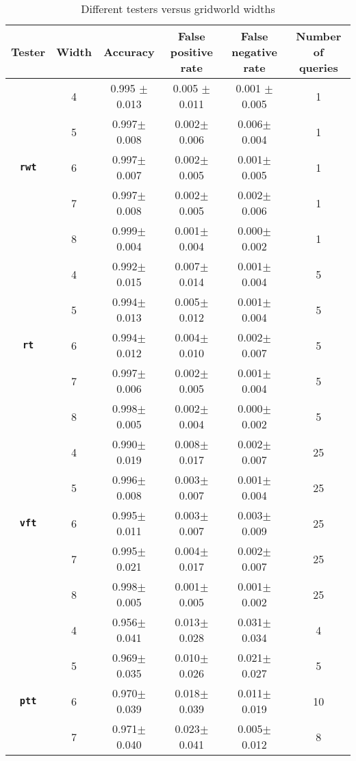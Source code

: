 \begin{table}[h]
  \caption{Different testers versus gridworld widths}
  \label{tab:diff_gwWidth}
  \centering
  \begin{tabular}{cccccc}
    \toprule
    \textbf{Tester}     & \textbf{Width}     & \textbf{Accuracy} & \textbf{False positive rate} & \textbf{False negative rate} & \textbf{Number of queries} \\
    \midrule
      & 4 & 0.995 $\pm$ 0.013 & 0.005	$\pm$ 0.011 & 0.001 $\pm$ 0.005	& 1  \\
     & 5 & 0.997$\pm$	0.008&	0.002$\pm$	0.006&	0.006$\pm$	0.004&	1\\
     \textbf{\texttt{rwt}} & 6 & 0.997$\pm$	0.007&	0.002$\pm$	0.005&	0.001$\pm$	0.005&	1\\
     & 7 & 0.997$\pm$	0.008&	0.002$\pm$	0.005&	0.002$\pm$	0.006&	1\\
     & 8 & 0.999$\pm$	0.004&	0.001$\pm$	0.004&	0.000$\pm$	0.002&	1\\
     \midrule
      & 4 & 0.992$\pm$	0.015&	0.007$\pm$	0.014&	0.001$\pm$	0.004&	5\\
     & 5 & 0.994$\pm$	0.013&	0.005$\pm$	0.012&	0.001$\pm$	0.004&	5\\
     \textbf{\texttt{rt}}& 6 & 0.994$\pm$	0.012&	0.004$\pm$	0.010&	0.002$\pm$	0.007&	5\\
     & 7 & 0.997$\pm$	0.006&	0.002$\pm$	0.005&	0.001$\pm$	0.004&	5\\
     & 8 & 0.998$\pm$	0.005&	0.002$\pm$	0.004&	0.000$\pm$	0.002&	5\\ 
     \midrule
      & 4 & 0.990$\pm$	0.019&	0.008$\pm$	0.017&	0.002$\pm$	0.007&	25\\
     & 5 & 0.996$\pm$	0.008&	0.003$\pm$	0.007&	0.001$\pm$	0.004&	25\\
     \textbf{\texttt{vft}}& 6 & 0.995$\pm$	0.011&	0.003$\pm$	0.007&	0.003$\pm$	0.009&	25\\
     & 7 & 0.995$\pm$	0.021&	0.004$\pm$	0.017&	0.002$\pm$	0.007&	25\\
     & 8 & 0.998$\pm$	0.005&	0.001$\pm$	0.005&	0.001$\pm$	0.002&	25\\
     \midrule
      & 4 & 0.956$\pm$	0.041&	0.013$\pm$	0.028&	0.031$\pm$	0.034&	4\\
     & 5 & 0.969$\pm$	0.035&	0.010$\pm$	0.026&	0.021$\pm$	0.027&	5\\
     \textbf{\texttt{ptt}}& 6 & 0.970$\pm$	0.039&	0.018$\pm$	0.039&	0.011$\pm$	0.019&	10\\
     & 7 & 0.971$\pm$	0.040&	0.023$\pm$	0.041&	0.005$\pm$	0.012&	8\\

\end{tabular}
\end{table}
